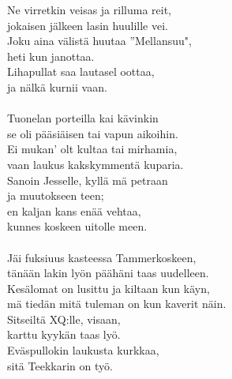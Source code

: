             Ne virretkin veisas ja rilluma reit, \\
            jokaisen jälkeen lasin huulille vei. \\
            Joku aina välistä huutaa ”Mellansuu", \\
            heti kun janottaa. \\
            Lihapullat saa lautasel oottaa, \\
            ja nälkä kurnii vaan. \\
\hspace{10mm} \\
            Tuonelan porteilla kai kävinkin \\
            se oli pääsiäisen tai vapun aikoihin. \\
            Ei mukan' olt kultaa tai mirhamia, \\
            vaan laukus kakskymmentä kuparia. \\
            Sanoin Jesselle, kyllä mä petraan \\
            ja muutokseen teen; \\
            en kaljan kans enää vehtaa,  \\
            kunnes koskeen uitolle meen. \\
\hspace{10mm} \\
            Jäi fuksiuus kasteessa Tammerkoskeen,  \\
            tänään lakin lyön päähäni taas uudelleen.  \\
            Kesälomat on lusittu ja kiltaan kun käyn, \\
            mä tiedän mitä tuleman on kun kaverit näin. \\
            Sitseiltä XQ:lle, visaan,  \\
            karttu kyykän taas lyö.  \\
            Eväspullokin laukusta kurkkaa, \\
            sitä Teekkarin on työ. \\
